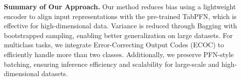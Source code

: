 \textbf{Summary of Our Approach.}  
Our method reduces bias using a lightweight encoder to align input representations with the pre-trained TabPFN, which is effective for high-dimensional data. Variance is reduced through Bagging with bootstrapped sampling, enabling better generalization on large datasets. For multiclass tasks, we integrate Error-Correcting Output Codes (ECOC) to efficiently handle more than two classes. Additionally, we preserve PFN-style batching, ensuring inference efficiency and scalability for large-scale and high-dimensional datasets.



